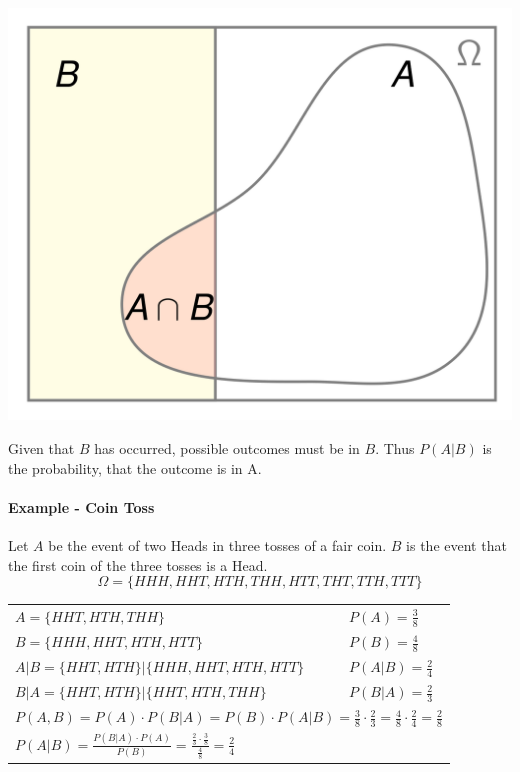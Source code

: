 \documentclass[11pt]{article}
\begin{document}
\noindent
\begin{minipage}{0.3\linewidth}
	\centering
	\includegraphics[width=\linewidth, keepaspectratio]{img/A_given_B}
\end{minipage}
\begin{minipage}{0.7\linewidth}
	Given that $B$ has occurred, possible outcomes must be in $B$. Thus $P(A|B)$ is the probability, that the outcome is in A.
\end{minipage}

\paragraph{Example - Coin Toss}
Let $A$ be the event of two Heads in three tosses of a fair coin. $B$ is the event that the first coin of the three tosses is a Head.
\begin{equation*}
	\Omega = \{HHH, HHT, HTH, THH, HTT, THT, TTH, TTT\}
\end{equation*}


\noindent
\begin{minipage}{\textwidth}
	\renewcommand{\arraystretch}{1.5}
	\centering
	\begin{tabularx}{\linewidth}{l X}
		$ A = \{HHT, HTH, THH\}$ & $P(A) = \frac{3}{8}$\\
		$ B = \{HHH, HHT, HTH, HTT\}$ & $P(B) = \frac{4}{8}$ \\
		$ A|B = \{HHT,HTH\} | \{HHH,HHT,HTH,HTT\}$ & $P(A|B) = \frac{2}{4}$\\
		$ B|A = \{HHT,HTH\} | \{HHT,HTH,THH\}$ & $P(B|A) = \frac{2}{3}$\\
		\multicolumn{2}{l}{$ P(A,B) = P(A)\cdot P(B|A) = P(B)\cdot P(A|B) = \frac{3}{8}\cdot\frac{2}{3}=\frac{4}{8}\cdot\frac{2}{4}=\frac{2}{8} $}\\
		\multicolumn{2}{l}{$ P(A|B) = \frac{P(B|A)\cdot P(A)}{P(B)} = \frac{\frac{2}{3}\cdot\frac{3}{8}}{\frac{4}{8}}=\frac{2}{4} $}
	\end{tabularx}
\end{minipage}
\end{document}
